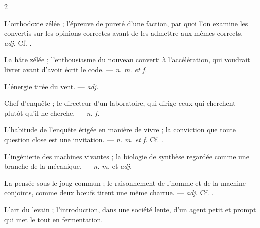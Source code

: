 \begin{multicols}{2}

 L'orthodoxie zélée ; l'épreuve de pureté d'une faction, par quoi l'on examine les convertis sur les opinions correctes avant de les admettre aux mèmes corrects. —  \textit{adj.} Cf. .

 La hâte zélée ; l'enthousiasme du nouveau converti à l'accélération, qui voudrait livrer avant d'avoir écrit le code. —  \textit{n. m. et f.}

 L'énergie tirée du vent. —  \textit{adj.}

 Chef d'enquête ; le directeur d'un laboratoire, qui dirige ceux qui cherchent plutôt qu'il ne cherche. —  \textit{n. f.}

 L'habitude de l'enquête érigée en manière de vivre ; la conviction que toute question close est une invitation. —  \textit{n. m. et f.} Cf. .

 L'ingénierie des machines vivantes ; la biologie de synthèse regardée comme une branche de la mécanique. —  \textit{n. m.} et  \textit{adj.}

 La pensée sous le joug commun ; le raisonnement de l'homme et de la machine conjoints, comme deux bœufs tirent une même charrue. —  \textit{adj.} Cf. .

 L'art du levain ; l'introduction, dans une société lente, d'un agent petit et prompt qui met le tout en fermentation.

\end{multicols}
